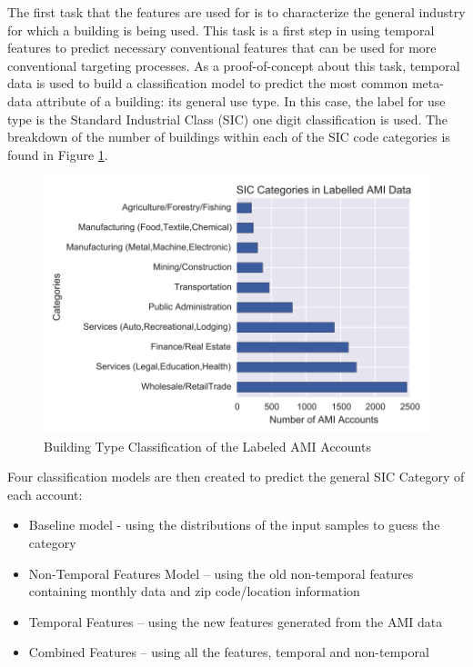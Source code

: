 The first task that the features are used for is to characterize the general industry for which a building is being used. This task is a first step in using temporal features to predict necessary conventional features that can be used for more conventional targeting processes. As a proof-of-concept about this task, temporal data is used to build a classification model to predict the most common meta-data attribute of a building: its general use type. In this case, the label for use type is the Standard Industrial Class (SIC) one digit classification is used. The breakdown of the number of buildings within each of the SIC code categories is found in Figure \ref{fig:buildingtypeclass}.





\begin{figure}[ht!]
\begin{center}
\includegraphics[width=0.84\columnwidth]{figures/measures/measures}
\caption{{Building Type Classification of the Labeled AMI Accounts
\label{fig:buildingtypeclass}%
}}
\end{center}
\end{figure}

Four classification models are then created to predict the general SIC Category of each account:
\begin{itemize}
\item Baseline model - using the distributions of the input samples to guess the category
\item Non-Temporal Features Model -- using the old non-temporal features containing monthly data and zip code/location information
\item Temporal Features -- using the new features generated from the AMI data
\item Combined Features -- using all the features, temporal and non-temporal
\end{itemize}

